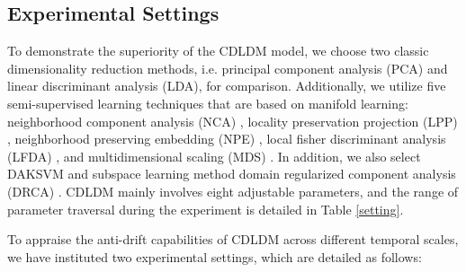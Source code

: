 \documentclass[a4paper]{cas-sc}
\begin{document}
\subsection{Experimental Settings} \label{ES}
To demonstrate the superiority of the CDLDM model, we choose two classic dimensionality reduction methods, i.e. principal component analysis (PCA) and linear discriminant analysis (LDA), for comparison. Additionally, we utilize five semi-supervised learning techniques that are based on manifold learning: neighborhood component analysis (NCA) \cite{NCA}, locality preservation projection (LPP) \cite{NIPS2003_d69116f8}, neighborhood preserving embedding (NPE) \cite{1544858}, local fisher discriminant analysis (LFDA) \cite{LFDA}, and multidimensional scaling (MDS) \cite{MDS}. In addition, we also select DAKSVM \citep{TAO20123962} and subspace learning method domain regularized component analysis (DRCA) \cite{ZHANG2017407}.
CDLDM mainly involves eight adjustable parameters, and the range of parameter traversal during the experiment is detailed in Table \ref{setting}.



To appraise the anti-drift capabilities of CDLDM across different temporal scales, we have instituted two experimental settings, which are detailed as follows:
\end{document}
